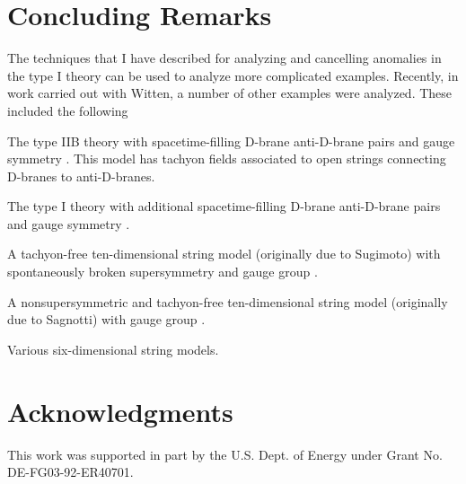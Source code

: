 \documentclass[a4paper,12pt]{article}
\begin{document}
\section{Concluding Remarks}
The techniques that I have described for analyzing and cancelling
anomalies in the type I \coordHE{} theory can be used to
analyze more complicated examples. Recently, in work carried out
with Witten,\cite{Schwarz:2001sf} a number of other examples were
analyzed. These included the following

\noindent \myHighlight{$\bullet$}\coordHE{} The type IIB theory with \coordHE{} spacetime-filling
D-brane anti-D-brane pairs and gauge symmetry \coordHE{}.\cite{Srednicki:1998mq} This model has tachyon fields
associated to open strings connecting D-branes to anti-D-branes.

\noindent \myHighlight{$\bullet$}\coordHE{} The type I theory with \coordHE{} additional
spacetime-filling D-brane anti-D-brane pairs and gauge symmetry
\coordHE{}.\cite{Sugimoto:1999tx}

\noindent \myHighlight{$\bullet$}\coordHE{} A tachyon-free ten-dimensional string model
(originally due to Sugimoto\cite{Sugimoto:1999tx}) with
spontaneously broken supersymmetry and gauge group \coordHE{}.

\noindent \myHighlight{$\bullet$}\coordHE{} A nonsupersymmetric and tachyon-free
ten-dimensional string model (originally due to
Sagnotti\cite{Sagnotti:1995ga}) with gauge group \coordHE{}.

\noindent \myHighlight{$\bullet$}\coordHE{} Various six-dimensional string models.


\section*{Acknowledgments}
This work was supported in part by the U.S. Dept. of Energy under
Grant No. DE-FG03-92-ER40701.
\end{document}
